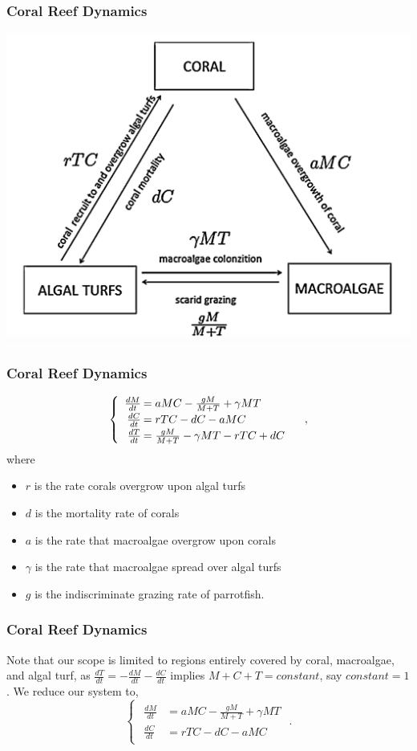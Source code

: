 \begin{frame}
\frametitle{Coral Reef Dynamics}
\includegraphics[natwidth=162bp,natheight=227bp,width=280bp]{./coral-reef-triangle.png}
\end{frame}
\begin{frame}\frametitle{Coral Reef Dynamics}
$$\begin{cases}\begin{array}{rl}
\frac{dM}{dt}\hspace{-.8em}&=aMC - \frac{gM}{M+T}+\gamma M T\\
\frac{dC}{dt}\hspace{-.8em}&=rTC - dC - aMC\\
\frac{dT}{dt}\hspace{-.8em}&=\frac{gM}{M + T} - \gamma MT - rTC + dC
\end{array}\end{cases},$$ where \begin{itemize}\itemsep0pt
\item $r$ is the rate corals overgrow upon algal turfs\\
\item $d$ is the mortality rate of corals\\
\item $a$ is the rate that macroalgae overgrow upon corals\\
\item $\gamma$ is the rate that macroalgae spread over algal turfs\\
\item $g$ is the indiscriminate grazing rate of parrotfish.
\end{itemize}
\end{frame}

\begin{frame}\frametitle{Coral Reef Dynamics}
\hspace{1.57em}Note that our scope is limited to regions entirely covered by coral, macroalgae, and algal turf, as $\frac{dT}{dt}=-\frac{dM}{dt}-\frac{dC}{dt}$ implies $M+C+T=constant$, say $constant = 1$.  We reduce our system to, $$\begin{cases} 
\begin{array}{rl}
\frac{dM}{dt}&= aMC-\frac{gM}{M+T} + \gamma MT\\ 
\frac{dC}{dt}&=rTC-dC-aMC
\end{array} \end{cases}.$$ 
\end{frame}

